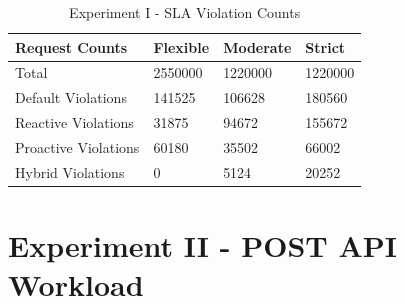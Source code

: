 \begin{table}
    \caption{Experiment I - SLA Violation Counts}\label{tab:exp1-sla-violation-count}
    \centering
    \begin{tabular}{|l|l|l|l|}
        \hline
        Request Counts & Flexible & Moderate & Strict \\
        \hline
        Total  & \num[group-separator={,}]{2550000} & \num[group-separator={,}]{1220000} & \num[group-separator={,}]{1220000} \\
        Default Violations & \num[group-separator={,}]{141525} & \num[group-separator={,}]{106628} & \num[group-separator={,}]{180560} \\
        Reactive Violations & \num[group-separator={,}]{31875} & \num[group-separator={,}]{94672} & \num[group-separator={,}]{155672} \\
        Proactive Violations & \num[group-separator={,}]{60180} & \num[group-separator={,}]{35502} & \num[group-separator={,}]{66002} \\
        Hybrid Violations & \num[group-separator={,}]{0} & \num[group-separator={,}]{5124} & \num[group-separator={,}]{20252} \\
         \hline
    \end{tabular}
\end{table}

\section{Experiment II - POST API Workload}
\label{sec:ch5-exp2-post-api}

